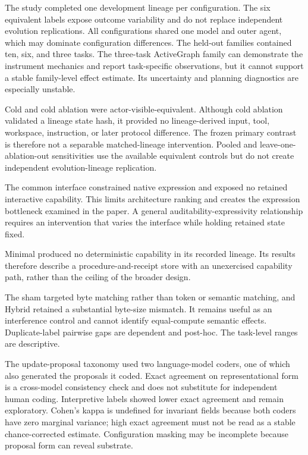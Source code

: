 \documentclass[10pt,twocolumn]{article}
\begin{document}
The study completed one development lineage per configuration. The six
equivalent labels expose outcome variability and do not replace
independent evolution replications. All configurations shared one model
and outer agent, which may dominate configuration differences. The
held-out families contained ten, six, and three tasks. The three-task
ActiveGraph family can demonstrate the instrument mechanics and report
task-specific observations, but it cannot support a stable family-level
effect estimate. Its uncertainty and planning diagnostics are especially
unstable.

Cold and cold ablation were actor-visible-equivalent. Although cold
ablation validated a lineage state hash, it provided no lineage-derived
input, tool, workspace, instruction, or later protocol difference. The
frozen primary contrast is therefore not a separable matched-lineage
intervention. Pooled and leave-one-ablation-out sensitivities use the
available equivalent controls but do not create independent
evolution-lineage replication.

The common interface constrained native expression and exposed no
retained interactive capability. This limits architecture ranking and
creates the expression bottleneck examined in the paper. A general
auditability-expressivity relationship requires an intervention that
varies the interface while holding retained state fixed.

Minimal produced no deterministic capability in its recorded lineage.
Its results therefore describe a procedure-and-receipt store with an
unexercised capability path, rather than the ceiling of the broader
design.

The sham targeted byte matching rather than token or semantic matching,
and Hybrid retained a substantial byte-size mismatch. It remains useful
as an interference control and cannot identify equal-compute semantic
effects. Duplicate-label pairwise gaps are dependent and post-hoc. The
task-level ranges are descriptive.

The update-proposal taxonomy used two language-model coders, one of
which also generated the proposals it coded. Exact agreement on
representational form is a cross-model consistency check and does not
substitute for independent human coding. Interpretive labels showed
lower exact agreement and remain exploratory. Cohen's kappa is undefined
for invariant fields because both coders have zero marginal variance;
high exact agreement must not be read as a stable chance-corrected
estimate. Configuration masking may be incomplete because proposal form
can reveal substrate.
\end{document}
